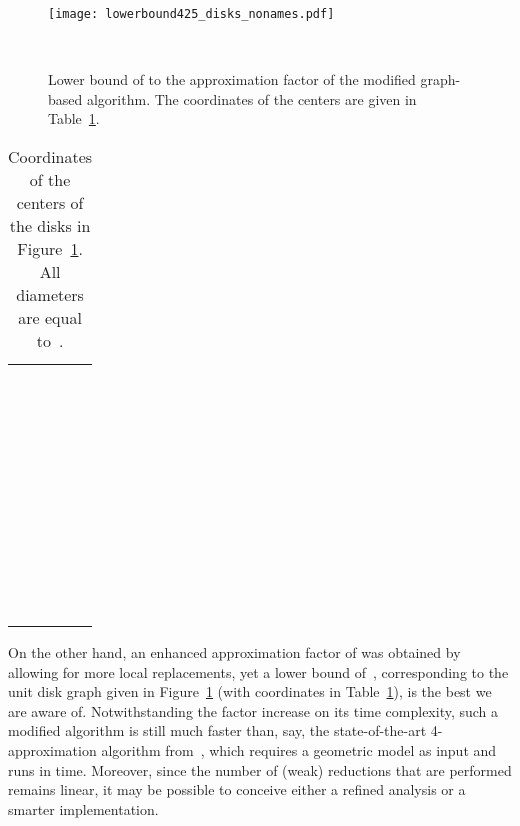 \documentclass[preprint,12pt]{elsarticle}
\begin{document}
\begin{figure}[t!]
 \centering
 \texttt{[image: lowerbound425\_disks\_nonames.pdf]}
 \caption{\label{f:lowerbound425}Lower bound of  to the approximation factor of the modified graph-based algorithm. The coordinates of the centers are given in Table~\ref{t:coordinates2}.}  
\bigskip
~
\end{figure}

\begin{table}[h!]
\begin{center}
\begin{tabular}{|lll|}
\hline
~ &  & \\
~ &  &  \\
~ &  &  \\
~ &  &  \\
~ &  &  \\
~ &  &  \\
~ &  &  \\
~ &  &  \\
~ &  & \\
\hline
\end{tabular}
\caption{\label{t:coordinates2} Coordinates of the centers of the disks in Figure~\ref{f:lowerbound425}. All diameters are equal to~.}
\end{center}
\end{table}

On the other hand, an enhanced approximation factor of  was obtained by allowing for more local replacements, yet a lower bound of~, corresponding to the unit disk graph given in Figure~\ref{f:lowerbound425} (with coordinates in Table~\ref{t:coordinates2}), is the best we are aware of.  
Notwithstanding the  factor increase on its time complexity,
such a modified algorithm is still much faster than, say, the state-of-the-art 4-approximation algorithm from~\cite{cccg}, which requires a geometric model as input and runs in  time. Moreover, since the number of (weak) reductions that are performed remains linear, it may be possible to conceive either a refined analysis or a smarter implementation.


\end{document}
